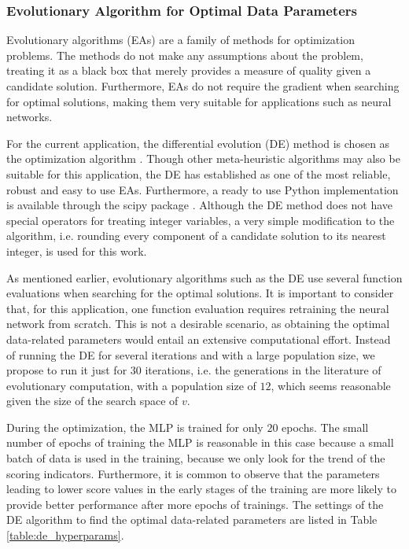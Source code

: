 \documentclass[preprint,12pt]{elsarticle}%
\begin{document}
\subsubsection{Evolutionary Algorithm for Optimal Data Parameters}

\label{sec:ea_optimization_process}

Evolutionary algorithms (EAs) are a family of methods for optimization
problems. The methods do not make any assumptions about the problem, treating
it as a black box that merely provides a measure of quality given a candidate
solution. Furthermore, EAs do not require the gradient when searching for
optimal solutions, making them very suitable for applications such as neural networks.

For the current application, the differential evolution (DE) method is chosen
as the optimization algorithm \cite{Storn1997}. Though other meta-heuristic
algorithms may also be suitable for this application, the DE has
established as one of the most reliable, robust and easy to use EAs.
Furthermore, a ready to use Python implementation is available through the
scipy package \cite{scipy}. Although the DE method does not have special
operators for treating integer variables, a very simple modification to the
algorithm, i.e. rounding every component of a candidate solution to its
nearest integer, is used for this work.

As mentioned earlier, evolutionary algorithms such as the DE use several
function evaluations when searching for the optimal solutions. It is important to consider that, for
this application, one function evaluation requires retraining the neural
network from scratch. This is not a desirable scenario, as obtaining the
optimal data-related parameters would entail an extensive computational
effort. Instead of running the DE for several iterations and with a large
population size, we propose to run it just for $30$ iterations, i.e. the
generations in the literature of evolutionary computation, with a population
size of $12$, which seems reasonable given the size of the search space of $v$.

During the optimization, the MLP is trained for only $20$ epochs. The small number
of epochs of training the MLP is reasonable in this case because a small batch
of data is used in the training, because we only look for the trend of the scoring indicators.
Furthermore, it is common to observe that the parameters leading to lower
score values in the early stages of the training are more likely to provide
better performance after more epochs of trainings. The settings of
the DE algorithm to find the optimal data-related parameters are listed in
Table \ref{table:de_hyperparams}.
\end{document}
